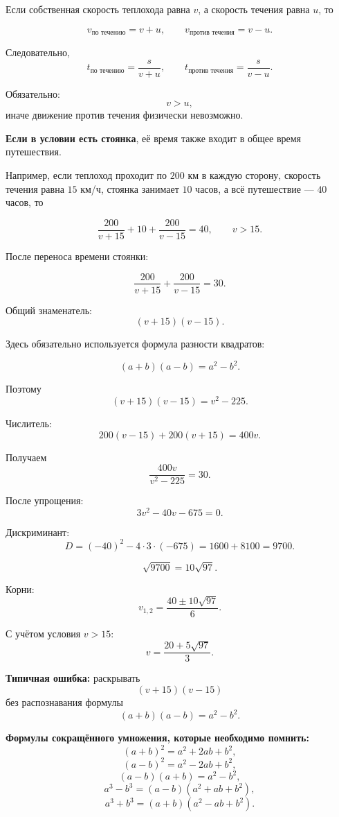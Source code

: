 \documentclass[a4paper,12pt]{article}
\newcommand{\important}[1]{\textbf{\color{darkaccent}#1}}
\begin{document}
Если собственная скорость теплохода равна \(v\), а скорость течения равна \(u\), то

\[
v_{\text{по течению}}=v+u,
\qquad
v_{\text{против течения}}=v-u.
\]

Следовательно,
\[
t_{\text{по течению}}=\frac{s}{v+u},
\qquad
t_{\text{против течения}}=\frac{s}{v-u}.
\]

Обязательно:
\[
v>u,
\]
иначе движение против течения физически невозможно.

\important{Если в условии есть стоянка}, её время также входит в общее время путешествия.

Например, если теплоход проходит по \(200\) км в каждую сторону, скорость течения равна \(15\) км/ч, стоянка занимает \(10\) часов, а всё путешествие --- \(40\) часов, то

\[
\frac{200}{v+15}+10+\frac{200}{v-15}=40,
\qquad v>15.
\]

После переноса времени стоянки:

\[
\frac{200}{v+15}+\frac{200}{v-15}=30.
\]

Общий знаменатель:
\[
(v+15)(v-15).
\]

Здесь обязательно используется формула разности квадратов:

\[
(a+b)(a-b)=a^2-b^2.
\]

Поэтому
\[
(v+15)(v-15)=v^2-225.
\]

Числитель:
\[
200(v-15)+200(v+15)=400v.
\]

Получаем
\[
\frac{400v}{v^2-225}=30.
\]

После упрощения:
\[
3v^2-40v-675=0.
\]

Дискриминант:
\[
D=(-40)^2-4\cdot3\cdot(-675)
=1600+8100
=9700.
\]

\[
\sqrt{9700}=10\sqrt{97}.
\]

Корни:
\[
v_{1,2}=\frac{40\pm10\sqrt{97}}{6}.
\]

С учётом условия \(v>15\):
\[
v=\frac{20+5\sqrt{97}}{3}.
\]

\important{Типичная ошибка:} раскрывать
\[
(v+15)(v-15)
\]
без распознавания формулы
\[
(a+b)(a-b)=a^2-b^2.
\]

\vspace{0.4em}

\textbf{Формулы сокращённого умножения, которые необходимо помнить:}
\[
(a+b)^2=a^2+2ab+b^2,
\]
\[
(a-b)^2=a^2-2ab+b^2,
\]
\[
(a-b)(a+b)=a^2-b^2,
\]
\[
a^3-b^3=(a-b)(a^2+ab+b^2),
\]
\[
a^3+b^3=(a+b)(a^2-ab+b^2).
\]

\end{document}
